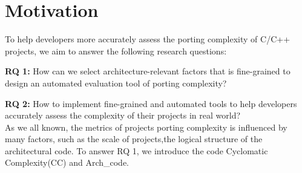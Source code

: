 \documentclass[sigconf,screen,review,anonymous]{acmart}
\begin{document}
\section{Motivation}
\label{sec:factor}
To help developers more accurately assess the porting complexity of C/C++ projects, we aim to answer the following research questions:

\textbf{RQ 1:} How can we select architecture-relevant factors that is fine-grained to design an automated evaluation tool of porting complexity?

\textbf{RQ 2:} How to implement fine-grained and automated tools to help developers accurately assess the complexity of their projects in real world?\\
As we all known, the metrics of projects porting complexity is influenced by many factors, such as the scale of projects,the logical structure of the architectural code. To answer RQ 1, we introduce the code Cyclomatic Complexity(CC) and Arch\_code.
 
\end{document}
